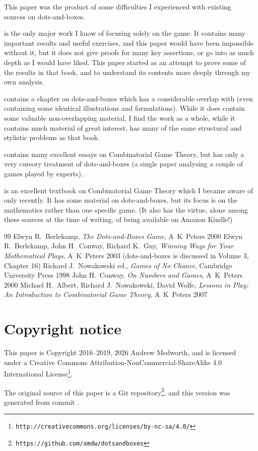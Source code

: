 \documentclass[a4paper,twocolumn]{article}
\begin{document}
This paper was the product of some difficulties I experienced with
existing sources on dots-and-boxes.

\cite{berl} is the only major work I know of focusing solely on the
game. It contains many important results and useful exercises, and
this paper would have been impossible without it, but it does not give
proofs for many key assertions, or go into as much depth as I would
have liked. This paper started as an attempt to prove some of the
results in that book, and to understand its contents more deeply
through my own analysis.

\cite{wways} contains a chapter on dots-and-boxes which has a
considerable overlap with \cite{berl} (even containing some identical
illustrations and formulations). While it does contain some valuable
non-overlapping material, I find the work as a whole, while it
contains much material of great interest, has many of the same
structural and stylistic problems as that book.

\cite{nochance} contains many excellent essays on Combinatorial Game
Theory, but has only a very cursory treatment of dots-and-boxes (a
single paper analysing a couple of games played by experts).

\cite{lip} is an excellent textbook on Combinatorial Game Theory which
I became aware of only recently. It has some material on
dots-and-boxes, but its focus is on the mathematics rather than one
specific game. (It also has the virtue, alone among these sources at
the time of writing, of being available on Amazon Kindle!)

\begin{thebibliography}{99}
   Elwyn R.\ Berlekamp, \emph{The Dots-and-Boxes Game},
    A~K~Peters 2000
   Elwyn R.\ Berlekamp, John H.\ Conway, Richard
    K.\ Guy, \emph{Winning Ways for Your Mathematical Plays},
    A~K~Peters 2003 (dots-and-boxes is discussed in Volume 3, Chapter
    16)
   Richard J.\ Nowakowski ed., \emph{Games of No
    Chance}, Cambridge University Press 1998
   John H.\ Conway, \emph{On Numbers and Games},
    A~K~Peters 2000
   Michael H.\ Albert, Richard J.\ Nowakowski, David
    Wolfe, \emph{Lessons in Play: An Introduction to Combinatorial
      Game Theory}, A~K~Peters 2007
\end{thebibliography}

\section*{Copyright notice}

This paper is Copyright 2016--2019, 2026 Andrew Medworth, and is licensed
under a Creative Commons Attribution-NonCommercial-ShareAlike 4.0
International
License\footnote{\texttt{http://creativecommons.org/licenses/by-nc-sa/4.0/}}.

 The original source of this paper is a Git
repository\footnote{\texttt{https://github.com/amdw/dotsandboxes}},
and this version was generated from commit \VCRevisionMod.
\end{document}
